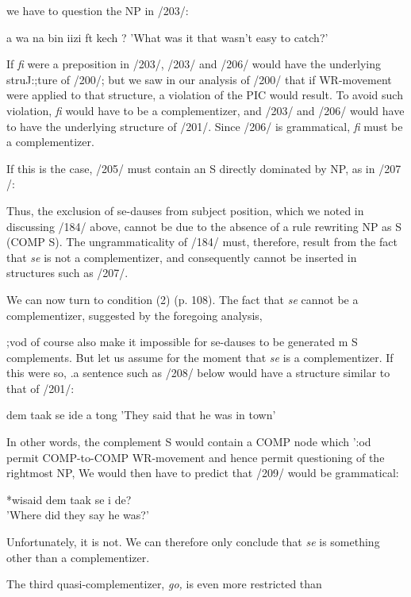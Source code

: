 we have to question the NP in /203/:

\ea\label{ex:206}
 a wa na bin iizi ft kech ?
\glt 'What was it that wasn't easy to catch?'
\z



If \textit{fi} were a preposition in /203/, /203/ and /206/ would have the under\-lying struJ:;ture of /200/; but we saw in our analysis of /200/ that if WR-movement were applied to that structure, a violation of the PIC
would result. To avoid such violation, \textit{fi} would have to be a complementizer, and /203/ and /206/ would have to have the underlying structure of /201/. Since /206/ is grammatical, \textit{fi} must be a complementizer.

If this is the case, /205/ must contain an S directly dominated by NP, as in /207 /:

Thus, the exclusion of se-dauses from subject position, which we noted in discussing /184/ above, cannot be due to the absence of a rule rewriting NP as S (COMP S). The ungrammaticality of /184/ must, therefore, result from the fact that \textit{se} is not a complementizer, and consequently cannot be inserted in structures such as /207/.

We can now turn to condition (2) (p. 108). The fact that \textit{se}
cannot be a complementizer, suggested by the foregoing analysis,

;vod of course also make it impossible for se-dauses to be generated m S complements. But let us assume for the moment that \textit{se} is a com\-plementizer. If this were so, .a sentence such as /208/ below would have a structure similar to that of /201/:

\ea\label{ex:208}
 dem taak se ide a tong
\glt 'They said that he was in town'
\z



In other words, the complement S would contain a COMP node which ':od permit COMP-to-COMP WR-movement and hence permit questioning of the rightmost NP, We would then have to predict that /209/
 would be grammatical:


\ea\label{ex:209}
*wisaid dem taak se i de? \\
\glt 'Where did they say he was?'
\z

Unfortunately, it is not. We can therefore only conclude that \textit{se }is something other than a complementizer.

The third quasi-complementizer, \textit{go,} is even more restricted than

